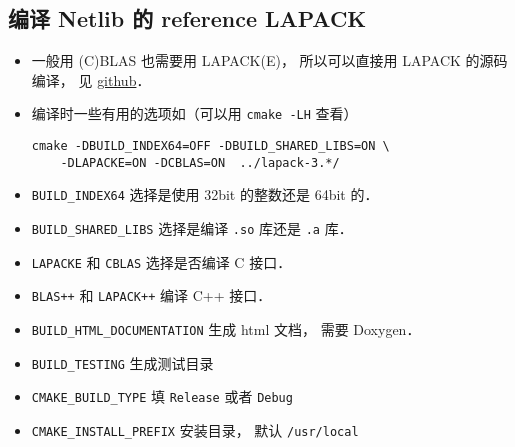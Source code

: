 \subsection{编译 Netlib 的 reference LAPACK}
\begin{itemize}
\item 一般用 (C)BLAS 也需要用 LAPACK(E)， 所以可以直接用 LAPACK 的源码编译， 见 \href{https://github.com/Reference-LAPACK/lapack/}{github}．
\item 编译时一些有用的选项如（可以用 \verb|cmake -LH| 查看）
\begin{lstlisting}[language=none]
cmake -DBUILD_INDEX64=OFF -DBUILD_SHARED_LIBS=ON \
    -DLAPACKE=ON -DCBLAS=ON  ../lapack-3.*/
\end{lstlisting}
\item \verb|BUILD_INDEX64| 选择是使用 32bit 的整数还是 64bit 的．
\item \verb|BUILD_SHARED_LIBS| 选择是编译 \verb|.so| 库还是 \verb|.a| 库．
\item \verb|LAPACKE| 和 \verb|CBLAS| 选择是否编译 C 接口．
\item \verb|BLAS++| 和 \verb|LAPACK++| 编译 C++ 接口．
\item \verb|BUILD_HTML_DOCUMENTATION| 生成 html 文档， 需要 Doxygen．
\item \verb|BUILD_TESTING| 生成测试目录
\item \verb|CMAKE_BUILD_TYPE| 填 \verb|Release| 或者 \verb|Debug|
\item \verb|CMAKE_INSTALL_PREFIX| 安装目录， 默认 \verb|/usr/local|
\end{itemize}
